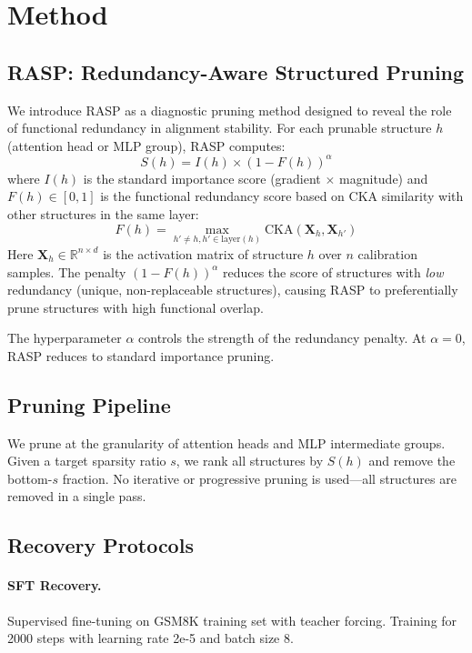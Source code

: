 \documentclass[11pt,a4paper]{article}
\begin{document}
\section{Method}

\subsection{RASP: Redundancy-Aware Structured Pruning}

We introduce RASP as a diagnostic pruning method designed to reveal the role of functional redundancy in alignment stability. For each prunable structure $h$ (attention head or MLP group), RASP computes:
\begin{equation}
S(h) = I(h) \times (1 - F(h))^{\alpha}
\label{eq:rasp}
\end{equation}
where $I(h)$ is the standard importance score (gradient $\times$ magnitude) and $F(h) \in [0,1]$ is the functional redundancy score based on CKA similarity with other structures in the same layer:
\begin{equation}
F(h) = \max_{h' \neq h, h' \in \text{layer}(h)} \text{CKA}(\mathbf{X}_h, \mathbf{X}_{h'})
\end{equation}
Here $\mathbf{X}_h \in \mathbb{R}^{n \times d}$ is the activation matrix of structure $h$ over $n$ calibration samples. The penalty $(1-F(h))^\alpha$ reduces the score of structures with \emph{low} redundancy (unique, non-replaceable structures), causing RASP to preferentially prune structures with high functional overlap.

The hyperparameter $\alpha$ controls the strength of the redundancy penalty. At $\alpha=0$, RASP reduces to standard importance pruning.

\subsection{Pruning Pipeline}

We prune at the granularity of attention heads and MLP intermediate groups. Given a target sparsity ratio $s$, we rank all structures by $S(h)$ and remove the bottom-$s$ fraction. No iterative or progressive pruning is used---all structures are removed in a single pass.

\subsection{Recovery Protocols}

\paragraph{SFT Recovery.} Supervised fine-tuning on GSM8K training set with teacher forcing. Training for 2000 steps with learning rate 2e-5 and batch size 8.
\end{document}
